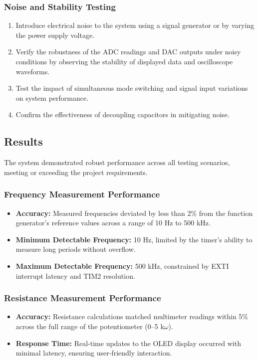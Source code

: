\subsubsection{Noise and Stability Testing}
\begin{enumerate}[leftmargin=2em]
    \item Introduce electrical noise to the system using a signal generator or by varying the power supply voltage.
    \item Verify the robustness of the ADC readings and DAC outputs under noisy conditions by observing the stability of displayed data and oscilloscope waveforms.
    \item Test the impact of simultaneous mode switching and signal input variations on system performance.
    \item Confirm the effectiveness of decoupling capacitors in mitigating noise.
\end{enumerate}

\subsection{Results}
The system demonstrated robust performance across all testing scenarios, meeting or exceeding the project requirements.

\subsubsection{Frequency Measurement Performance}
\begin{itemize}[leftmargin=2em]
    \item \textbf{Accuracy:} Measured frequencies deviated by less than 2\% from the function generator's reference values across a range of 10 Hz to 500 kHz.
    \item \textbf{Minimum Detectable Frequency:} 10 Hz, limited by the timer's ability to measure long periods without overflow.
    \item \textbf{Maximum Detectable Frequency:} 500 kHz, constrained by EXTI interrupt latency and TIM2 resolution.
\end{itemize}

\subsubsection{Resistance Measurement Performance}
\begin{itemize}[leftmargin=2em]
    \item \textbf{Accuracy:} Resistance calculations matched multimeter readings within 5\% across the full range of the potentiometer (0–5 k$\omega$).
    \item \textbf{Response Time:} Real-time updates to the OLED display occurred with minimal latency, ensuring user-friendly interaction.
\end{itemize}


